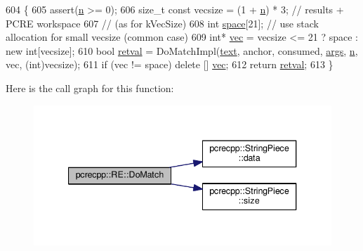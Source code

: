 \begin{DoxyCode}
604                               \{
605   assert(\hyperlink{group__APACHE__CORE__PROTO_gad484edfd58b9127caa8f0f59b4004d09}{n} >= 0);
606   \textcolor{keywordtype}{size\_t} \textcolor{keyword}{const} vecsize = (1 + \hyperlink{group__APACHE__CORE__PROTO_gad484edfd58b9127caa8f0f59b4004d09}{n}) * 3;  \textcolor{comment}{// results + PCRE workspace}
607                                        \textcolor{comment}{// (as for kVecSize)}
608   \textcolor{keywordtype}{int} \hyperlink{README_8txt_a19182255958ecd8b8391dae50d6673c1}{space}[21];   \textcolor{comment}{// use stack allocation for small vecsize (common case)}
609   \textcolor{keywordtype}{int}* \hyperlink{group__apr__file__io_ga026ee9293cfdb03a3944adbd192f1ead}{vec} = vecsize <= 21 ? space : \textcolor{keyword}{new} \textcolor{keywordtype}{int}[vecsize];
610   \textcolor{keywordtype}{bool} \hyperlink{group__apr__thread__proc_gabf8925f55d77c20b76e036eaf58f0c26}{retval} = DoMatchImpl(\hyperlink{group__APR__Util__XML_ga6f353ddc97cf6dc93417f58016afe82c}{text}, anchor, consumed, \hyperlink{group__APACHE__CORE__MPM_gaa72bdc340ae9df68cd6f4afa28f1fd81}{args}, \hyperlink{group__APACHE__CORE__PROTO_gad484edfd58b9127caa8f0f59b4004d09}{n}, vec, (\textcolor{keywordtype}{int})vecsize);
611   \textcolor{keywordflow}{if} (vec != space) \textcolor{keyword}{delete} [] \hyperlink{group__apr__file__io_ga026ee9293cfdb03a3944adbd192f1ead}{vec};
612   \textcolor{keywordflow}{return} \hyperlink{group__apr__thread__proc_gabf8925f55d77c20b76e036eaf58f0c26}{retval};
613 \}
\end{DoxyCode}


Here is the call graph for this function\+:
\nopagebreak
\begin{figure}[H]
\begin{center}
\leavevmode
\includegraphics[width=340pt]{classpcrecpp_1_1RE_aaafe0f3a68a3f754234efc814f8d2f9a_cgraph}
\end{center}
\end{figure}




